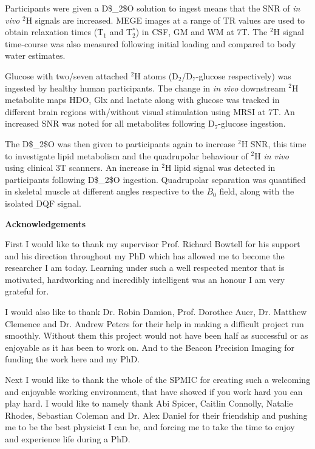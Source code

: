 \documentclass[12pt,english]{report}
\begin{document}
Participants were given a \ac{D$_2$O} solution to ingest means that the \ac{SNR} of \textit{in vivo} $^2$H signals are increased. \ac{MEGE} images at a range of \ac{TR} values are used to obtain relaxation times (T$_1$ and T$_2^*$) in \ac{CSF}, \ac{GM} and \ac{WM} at 7T. The $^2$H signal time-course was also measured following initial loading and compared to body water estimates.

Glucose with two/seven attached $^2$H atoms (D$_2$/D$_7$-glucose respectively) was ingested by healthy human participants. The change in \textit{in vivo} downstream $^2$H metabolite maps \ac{HDO}, Glx and lactate along with glucose was tracked in different brain regions with/without visual stimulation using \ac{MRSI} at 7T. An increased \ac{SNR} was noted for all metabolites following D$_7$-glucose ingestion.

The \ac{D$_2$O} was then given to participants again to increase $^2$H \ac{SNR}, this time to investigate lipid metabolism and the quadrupolar behaviour of $^2$H \textit{in vivo} using clinical 3T scanners. An increase in $^2$H lipid signal was detected in participants following \ac{D$_2$O} ingestion. Quadrupolar separation was quantified in skeletal muscle at different angles respective to the $B_0$ field, along with the isolated \ac{DQF} signal.
\vspace*{\fill}

\newpage
\vspace*{\fill}

\newpage
\thispagestyle{plain}
\begin{center}
    \textbf{Acknowledgements}
\end{center}
First I would like to thank my supervisor Prof. Richard Bowtell for his support and his direction throughout my PhD which has allowed me to become the researcher I am today. Learning under such a well respected mentor that is motivated, hardworking and incredibly intelligent was an honour I am very grateful for. 

I would also like to thank Dr. Robin Damion, Prof. Dorothee Auer, Dr. Matthew Clemence and Dr. Andrew Peters for their help in making a difficult project run smoothly. Without them this project would not have been half as successful or as enjoyable as it has been to work on. And to the Beacon Precision Imaging for funding the work here and my PhD.

Next I would like to thank the whole of the SPMIC for creating such a welcoming and enjoyable working environment, that have showed if you work hard you can play hard. I would like to namely thank Abi Spicer, Caitlin Connolly, Natalie Rhodes, Sebastian Coleman and Dr. Alex Daniel for their friendship and pushing me to be the best physicist I can be, and forcing me to take the time to enjoy and experience life during a PhD.
\end{document}
